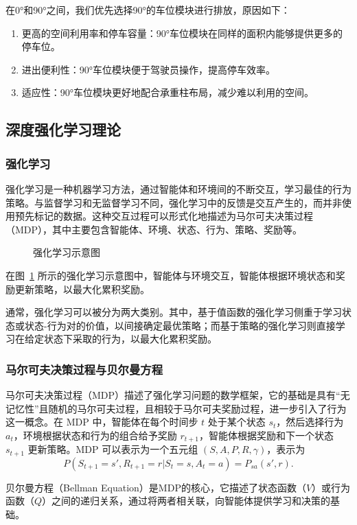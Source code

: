在0°和90°之间，我们优先选择90°的车位模块进行排放，原因如下：

\begin{enumerate}
\item 更高的空间利用率和停车容量：90°车位模块在同样的面积内能够提供更多的停车位。
\item 进出便利性：90°车位模块便于驾驶员操作，提高停车效率。
\item 适应性：90°车位模块更好地配合承重柱布局，减少难以利用的空间。
\end{enumerate}

\subsection{深度强化学习理论}
\subsubsection{强化学习}
强化学习是一种机器学习方法，通过智能体和环境间的不断交互，学习最佳的行为策略。\cite{sutton2018reinforcement}与监督学习和无监督学习不同，强化学习中的反馈是交互产生的，而并非使用预先标记的数据。这种交互过程可以形式化地描述为马尔可夫决策过程（MDP），其中主要包含智能体、环境、状态、行为、策略、奖励等。
\begin{figure}[!htb]
    \centering
    
    \caption{强化学习示意图}
    \label{fig:rl_structure}
\end{figure}

在图~\ref{fig:rl_structure} 所示的强化学习示意图中，智能体与环境交互，智能体根据环境状态和奖励更新策略，以最大化累积奖励。

通常，强化学习可以被分为两大类别。其中，基于值函数的强化学习侧重于学习状态或状态-行为对的价值，以间接确定最优策略；而基于策略的强化学习则直接学习在给定状态下采取的行为，以最大化累积奖励。
\subsubsection{马尔可夫决策过程与贝尔曼方程}
马尔可夫决策过程（MDP）描述了强化学习问题的数学框架，它的基础是具有“无记忆性”且随机的马尔可夫过程，且相较于马尔可夫奖励过程，进一步引入了行为这一概念。在 MDP 中，智能体在每个时间步 $t$ 处于某个状态 $s_t$，然后选择行为 $a_t$，环境根据状态和行为的组合给予奖励 $r_{t+1}$，智能体根据奖励和下一个状态 $s_{t+1}$ 更新策略。MDP 可以表示为一个五元组 $(S, A, P, R, \gamma)$，表示为$$P(S_{t+1}=s', R_{t+1}=r|S_t=s, A_t=a) = P_{sa}(s', r).$$

贝尔曼方程（Bellman Equation）是MDP的核心，它描述了状态函数（$V$）或行为函数（$Q$）之间的递归关系，通过将两者相关联，向智能体提供学习和决策的基础。

